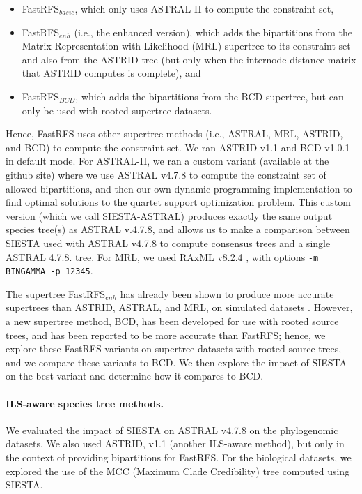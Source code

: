 \begin{itemize}
\item FastRFS$_{basic}$, which only uses ASTRAL-II to compute the constraint set,
\item FastRFS$_{enh}$ (i.e., the enhanced version),  which adds the bipartitions from the Matrix Representation with Likelihood (MRL) supertree to its constraint set and also from the ASTRID tree (but only when the internode distance matrix that ASTRID computes is complete), and
\item FastRFS$_{BCD}$, which adds the bipartitions from the BCD supertree, but can only be used with  rooted supertree datasets.
\end{itemize}
Hence, FastRFS uses other supertree methods (i.e., ASTRAL, MRL, ASTRID, and BCD)  to compute the constraint set. 
We ran ASTRID v1.1 and  BCD v1.0.1 in default mode.
For ASTRAL-II, we ran a custom variant (available at the github site) where we use ASTRAL v4.7.8 to compute the constraint set of allowed bipartitions, and then our own dynamic programming implementation  to find optimal solutions to the quartet support optimization problem.
This custom version (which we call SIESTA-ASTRAL) produces exactly the same output species tree(s) as ASTRAL v.4.7.8, and allows us to make a comparison between SIESTA used with ASTRAL v4.7.8 to compute consensus trees and a single ASTRAL 4.7.8. tree.
For MRL, we used RAxML v8.2.4 \cite{Stamatakis2014}, with options \texttt{-m BINGAMMA -p 12345}. 


The supertree  FastRFS$_{enh}$ has already been shown to produce more accurate supertrees than ASTRID, ASTRAL, and MRL, on simulated datasets \cite{vachaspati2017fastrfs}.
However, a new supertree method, BCD,  has been developed for use with rooted source trees, and has been reported to be more accurate than FastRFS; hence, we explore these FastRFS variants on supertree datasets with rooted source trees, and we compare these variants to BCD.
We then explore the impact of SIESTA on the best variant and determine how it compares to BCD.

\paragraph{ILS-aware species tree methods. }
We evaluated the impact of SIESTA on  ASTRAL v4.7.8 on the phylogenomic datasets. 
We also used ASTRID, v1.1 (another ILS-aware method), but only in the context of providing bipartitions for FastRFS.
For the biological datasets, we explored the use of the MCC (Maximum Clade Credibility) tree computed using SIESTA.

